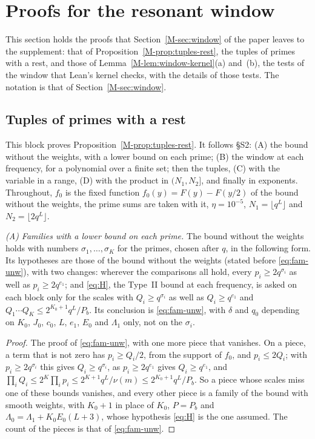 \documentclass[11pt]{article}
\numberwithin{equation}{section}
\begin{document}
\section{Proofs for the resonant window}\label{sup:window}

This section holds the proofs that Section~\ref{M-sec:window} of the paper leaves to the supplement: that of
Proposition~\ref{M-prop:tuples-rest}, the tuples of primes with a rest, and those of Lemma~\ref{M-lem:window-kernel}(a)
and~(b), the tests of the window that Lean's kernel checks, with the details of those tests. The notation is that of
Section~\ref{M-sec:window}.

\subsection*{Tuples of primes with a rest}

This block proves Proposition~\ref{M-prop:tuples-rest}. It follows \S S2: (A) the bound without the weights, with a
lower bound on each prime; (B) the window at each frequency, for a polynomial over a finite set; then the tuples, (C)
with the variable in a range, (D) with the product in $(N_1, N_2]$, and finally in exponents. Throughout, $f_0$ is the
fixed function
$f_0(y) = F(y) - F(y/2)$ of the bound without the weights, the prime sums are taken with it, $\eta = 10^{-5}$, $N_1 =
\lfloor q^L \rfloor$ and $N_2 = \lfloor 2q^L \rfloor$.

\emph{(A) Families with a lower bound on each prime.} The bound without the weights holds with numbers $\sigma_1,
\dots, \sigma_K$ for the primes, chosen after $q$, in the following form. Its hypotheses are those of the bound without
the weights (stated before \eqref{eq:fam-unw}), with two changes: wherever the comparisons all hold, every $p_i \ge
2q^{\sigma_i}$ as well as $p_i \ge 2q^{e_1}$; and \eqref{eq:H}, the Type~II bound at each frequency, is asked on each
block only for the scales with $Q_i \ge q^{\sigma_i}$ as well as $Q_i \ge q^{e_1}$ and
$Q_1 \cdots Q_K \le 2^{K_0 + 1} q^L/P_b$. Its conclusion is \eqref{eq:fam-unw}, with $\delta$ and $q_0$ depending on
$K_0$, $J_0$, $c_0$, $L$, $e_1$, $E_0$ and $\Lambda_1$ only, not on the $\sigma_i$.

\begin{proof}
The proof of \eqref{eq:fam-unw}, with one more piece that vanishes. On a piece, a term that is not zero has $p_i \ge
Q_i/2$, from the support of $f_0$, and $p_i \le 2Q_i$; with $p_i \ge 2q^{\sigma_i}$ this gives $Q_i \ge q^{\sigma_i}$,
as $p_i \ge 2q^{e_1}$ gives $Q_i \ge q^{e_1}$, and $\prod_i Q_i \le 2^K \prod_i p_i \le 2^{K + 1} q^L/\nu(m) \le 2^{K_0
+ 1} q^L/P_b$. So a piece whose scales miss one of these bounds vanishes, and every other piece is a family of the bound
with smooth weights, with $K_0 + 1$ in place of $K_0$, $P = P_b$ and $\Lambda_0 = \Lambda_1 + K_0 E_0 (L + 3)$, whose
hypothesis \eqref{eq:H} is the one assumed. The count of the pieces is that of \eqref{eq:fam-unw}.
\end{proof}
\end{document}
